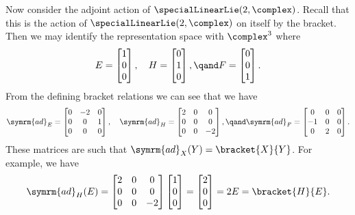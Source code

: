 \documentclass[fleqn]{NotesClass}
\newcommand{\ad}{\symrm{ad}}
\begin{document}
    Now consider the adjoint action of \(\specialLinearLie(2, \complex)\).
    Recall that this is the action of \(\specialLinearLie(2, \complex)\) on itself by the bracket.
    Then we may identify the representation space with \(\complex^3\) where
    \begin{equation}
        E = 
        \begin{bmatrix}
            1\\ 0\\ 0
        \end{bmatrix}
        , \quad H = 
        \begin{bmatrix}
            0\\ 1\\ 0
        \end{bmatrix}
        , \qand F = 
        \begin{bmatrix}
            0\\ 0\\ 1
        \end{bmatrix}
        .
    \end{equation}
    From the defining bracket relations we can see that we have
    \begin{equation*}
        \ad_E =
        \begin{bmatrix}
            0 & -2 & 0\\
            0 & 0 & 1\\
            0 & 0 & 0
        \end{bmatrix}
        , \quad
        \ad_H = 
        \begin{bmatrix}
            2 & 0 & 0\\
            0 & 0 & 0\\
            0 & 0 & -2
        \end{bmatrix}
        , \qand \ad_F = 
        \begin{bmatrix}
            0 & 0 & 0\\
            -1 & 0 & 0\\
            0 & 2 & 0
        \end{bmatrix}
        .
    \end{equation*}
    These matrices are such that \(\ad_X(Y) = \bracket{X}{Y}\).
    For example, we have
    \begin{equation}
        \ad_H(E) =
        \begin{bmatrix}
            2 & 0 & 0\\
            0 & 0 & 0\\
            0 & 0 & -2
        \end{bmatrix}
        \begin{bmatrix}
            1\\ 0\\ 0
        \end{bmatrix}
        =
        \begin{bmatrix}
            2\\ 0\\ 0
        \end{bmatrix}
        = 2E = \bracket{H}{E}.
    \end{equation}
\end{document}
